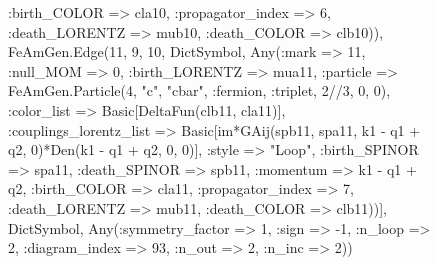 \documentclass{revtex4}
\begin{document}
\begin{figure}[!htb]
\begin{center}
{:birth_COLOR => cla10, :propagator_index => 6, :death_LORENTZ => mub10, :death_COLOR => clb10)), FeAmGen.Edge(11, 9, 10, Dict{Symbol, Any}(:mark => 11, :null_MOM => 0, :birth_LORENTZ => mua11, :particle => FeAmGen.Particle(4, "c", "cbar", :fermion, :triplet, 2//3, 0, 0), :color_list => Basic[DeltaFun(clb11, cla11)], :couplings_lorentz_list => Basic[im*GAij(spb11, spa11, k1 - q1 + q2, 0)*Den(k1 - q1 + q2, 0, 0)], :style => "Loop", :birth_SPINOR => spa11, :death_SPINOR => spb11, :momentum => k1 - q1 + q2, :birth_COLOR => cla11, :propagator_index => 7, :death_LORENTZ => mub11, :death_COLOR => clb11))], Dict{Symbol, Any}(:symmetry_factor => 1, :sign => -1, :n_loop => 2, :diagram_index => 93, :n_out => 2, :n_inc => 2)) 
}
\end{center}
\end{figure}
\end{document}
